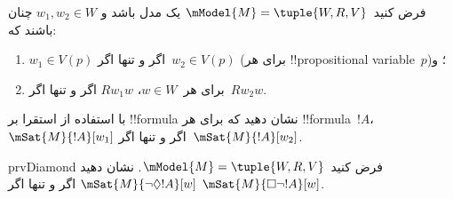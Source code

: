 \documentclass[../../../include/open-logic-section]{subfiles}
\begin{document}
\begin{prob}
  فرض کنید~$\mModel{M} = \tuple{W, R, V}$ یک مدل باشد و
  $w_1, w_2 \in W$ چنان باشند که:
  \begin{enumerate}
  \item $w_1 \in V(p)$ اگر و تنها اگر~$w_2 \in V(p)$ (برای هر
    !!{propositional variable}~$p$)؛ و
  \item برای هر~$w \in W$، $Rw_1w$ اگر و تنها اگر~$Rw_2w$.
  \end{enumerate}
  با استفاده از استقرا بر !!{formula} نشان دهید که برای هر !!{formula}~$!A$،
  $\mSat{M}{!A}[w_1]$ اگر و تنها اگر~$\mSat{M}{!A}[w_2]$.
\end{prob}

\begin{probtag}{prvDiamond}
  فرض کنید~$\mModel{M} = \tuple{W, R, V}$. نشان دهید
  $\mSat{M}{\lnot\Diamond !A}[w]$ اگر و تنها اگر
  $\mSat{M}{\Box\lnot!A}[w]$.
\end{probtag}
\end{document}

